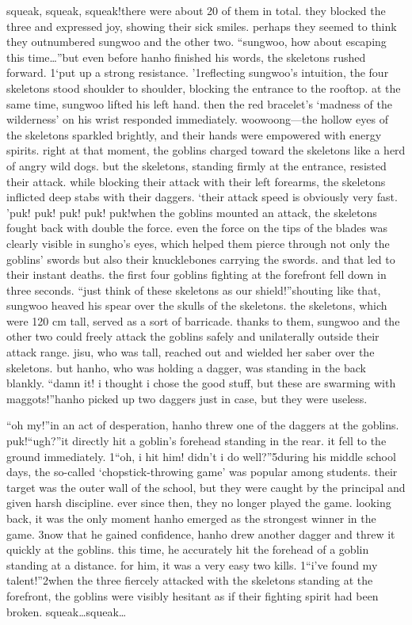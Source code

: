 squeak, squeak, squeak!there were about 20 of them in total.
they blocked the three and expressed joy, showing their sick smiles.
 perhaps they seemed to think they outnumbered sungwoo and the other two.
“sungwoo, how about escaping this time…”but even before hanho finished his words, the skeletons rushed forward.
1‘put up a strong resistance.
’1reflecting sungwoo’s intuition, the four skeletons stood shoulder to shoulder, blocking the entrance to the rooftop.
at the same time, sungwoo lifted his left hand.
 then the red bracelet’s ‘madness of the wilderness’ on his wrist responded immediately.
woowoong—the hollow eyes of the skeletons sparkled brightly, and their hands were empowered with energy spirits.
 right at that moment, the goblins charged toward the skeletons like a herd of angry wild dogs.
but the skeletons, standing firmly at the entrance, resisted their attack.
 while blocking their attack with their left forearms, the skeletons inflicted deep stabs with their daggers.
‘their attack speed is obviously very fast.
’puk! puk! puk! puk! puk!when the goblins mounted an attack, the skeletons fought back with double the force.
 even the force on the tips of the blades was clearly visible in sungho’s eyes, which helped them pierce through not only the goblins’ swords but also their knucklebones carrying the swords.
 and that led to their instant deaths.
the first four goblins fighting at the forefront fell down in three seconds.
“just think of these skeletons as our shield!”shouting like that, sungwoo heaved his spear over the skulls of the skeletons.
the skeletons, which were 120 cm tall, served as a sort of barricade.
 thanks to them, sungwoo and the other two could freely attack the goblins safely and unilaterally outside their attack range.
jisu, who was tall, reached out and wielded her saber over the skeletons.
 but hanho, who was holding a dagger, was standing in the back blankly.
“damn it! i thought i chose the good stuff, but these are swarming with maggots!”hanho picked up two daggers just in case, but they were useless.


“oh my!”in an act of desperation, hanho threw one of the daggers at the goblins.
puk!“ugh?”it directly hit a goblin’s forehead standing in the rear.
 it fell to the ground immediately.
1“oh, i hit him! didn’t i do well?”5during his middle school days, the so-called ‘chopstick-throwing game’ was popular among students.
 their target was the outer wall of the school, but they were caught by the principal and given harsh discipline.
 ever since then, they no longer played the game.
 looking back, it was the only moment hanho emerged as the strongest winner in the game.
3now that he gained confidence, hanho drew another dagger and threw it quickly at the goblins.
 this time, he accurately hit the forehead of a goblin standing at a distance.
 for him, it was a very easy two kills.
1“i’ve found my talent!”2when the three fiercely attacked with the skeletons standing at the forefront, the goblins were visibly hesitant as if their fighting spirit had been broken.
squeak…squeak…

 